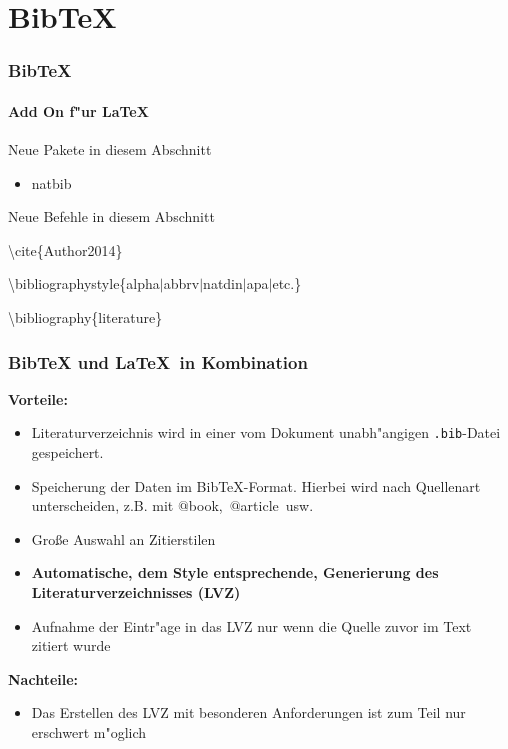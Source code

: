 \section{BibTeX}
\begin{frame}
\frametitle{BibTeX}
\framesubtitle{Add On f"ur \LaTeX}
\begin{exampleblock}{Neue Pakete in diesem Abschnitt}
\begin{itemize}
\item natbib
\end{itemize}
\end{exampleblock}

\begin{block}{Neue Befehle in diesem Abschnitt}
\begin{itemize}
\begin{ttfamily}
\item \color{nounibaredI}\textbackslash cite\color{black}\{Author2014\}
\item \color{nounibaredI}\textbackslash bibliographystyle\color{black}\{alpha$\mid$abbrv$\mid$natdin$\mid$apa$\mid$etc.\}
\item \color{nounibaredI}\textbackslash bibliography\color{black}\{literature\}
\end{ttfamily}
\end{itemize}
\end{block}
\end{frame}


\begin{frame}
\frametitle{BibTeX und \LaTeX ~in Kombination}
\textbf{Vorteile:}
\begin{itemize}
\item Literaturverzeichnis wird in einer vom Dokument unabh"angigen \texttt{.bib}-Datei gespeichert.
\item Speicherung der Daten im BibTeX-Format. Hierbei wird nach Quellenart unterscheiden, z.B. mit \color{nounibaredI}$@$book\color{black},~\color{nounibaredI}$@$article\color{black}~usw.
\item Gro\ss e Auswahl an Zitierstilen
\item \textbf{Automatische, dem Style entsprechende, Generierung des Literaturverzeichnisses (LVZ)}
\item Aufnahme der Eintr"age in das LVZ nur wenn die Quelle zuvor im Text zitiert wurde
\end{itemize}
\textbf{Nachteile:}
\begin{itemize}
\item Das Erstellen des LVZ mit besonderen Anforderungen ist zum Teil nur erschwert m"oglich
\end{itemize}
\end{frame}


